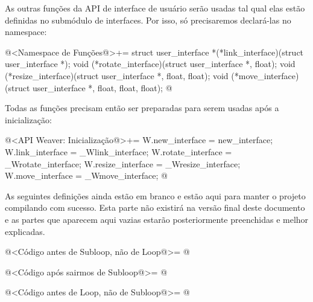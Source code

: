 As outras funções da API de interface de usuário serão usadas tal qual
elas estão definidas no submódulo de interfaces. Por isso, só
precisaremos declará-las no namespace:

\iniciocodigo
@<Namespace de Funções@>+=
struct user_interface *(*link_interface)(struct user_interface *);
void (*rotate_interface)(struct user_interface *, float);
void (*resize_interface)(struct user_interface *, float, float);
void (*move_interface)(struct user_interface *, float, float, float);
@
\fimcodigo

Todas as funções precisam então ser preparadas para serem usadas após
a inicialização:

\iniciocodigo
@<API Weaver: Inicialização@>+=
W.new_interface = new_interface;
W.link_interface = _Wlink_interface;
W.rotate_interface = _Wrotate_interface;
W.resize_interface = _Wresize_interface;
W.move_interface = _Wmove_interface;
@
\fimcodigo



As seguintes definições ainda estão em branco e estão aqui para manter
o projeto compilando com sucesso. Esta parte não existirá na versão
final deste documento e as partes que aparecem aqui vazias estarão
posteriormente preenchidas e melhor explicadas.

\iniciocodigo
@<Código antes de Subloop, não de Loop@>=
@
\fimcodigo

\iniciocodigo
@<Código após sairmos de Subloop@>=
@
\fimcodigo



\iniciocodigo
@<Código antes de Loop, não de Subloop@>=
@
\fimcodigo






\fim
